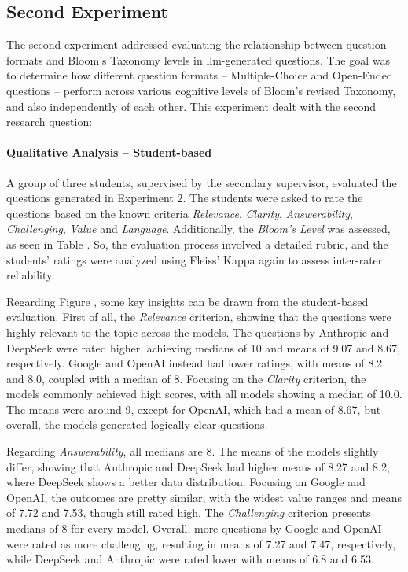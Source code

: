 \subsection{Second Experiment}
\label{sec:second-experiment}

The second experiment addressed evaluating the relationship between question formats and Bloom's Taxonomy levels in \ac{llm}-generated questions. The goal was to determine how different question formats -- Multiple-Choice and Open-Ended questions -- perform across various cognitive levels of Bloom's revised Taxonomy, and also independently of each other. This experiment dealt with the second research question:


\paragraph*{Qualitative Analysis -- Student-based} 

A group of three students, supervised by the secondary supervisor, evaluated the questions generated in Experiment 2. The students were asked to rate the questions based on the known criteria \textit{Relevance}, \textit{Clarity}, \textit{Answerability}, \textit{Challenging}, \textit{Value} and \textit{Language}. Additionally, the \textit{Bloom's Level} was assessed, as seen in Table . So, the evaluation process involved a detailed rubric, and the students' ratings were analyzed using Fleiss' Kappa again to assess inter-rater reliability.

Regarding Figure , some key insights can be drawn from the student-based evaluation. First of all, the \textit{Relevance} criterion, showing that the questions were highly relevant to the topic across the models. The questions by Anthropic and DeepSeek were rated higher, achieving medians of 10 and means of 9.07 and 8.67, respectively. Google and OpenAI instead had lower ratings, with means of 8.2 and 8.0, coupled with a median of 8. Focusing on the \textit{Clarity} criterion, the models commonly achieved high scores, with all models showing a median of 10.0. The means were around 9, except for OpenAI, which had a mean of 8.67, but overall, the models generated logically clear questions.

Regarding \textit{Answerability}, all medians are 8. The means of the models slightly differ, showing that Anthropic and DeepSeek had higher means of 8.27 and 8.2, where DeepSeek shows a better data distribution. Focusing on Google and OpenAI, the outcomes are pretty similar, with the widest value ranges and means of 7.72 and 7.53, though still rated high. The \textit{Challenging} criterion presents medians of 8 for every model. Overall, more questions by Google and OpenAI were rated as more challenging, resulting in means of 7.27 and 7.47, respectively, while DeepSeek and Anthropic were rated lower with means of 6.8 and 6.53.

